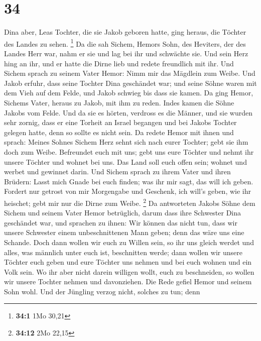 \hypertarget{section-8}{%
\section{34}\label{section-8}}

 Dina aber, Leas Tochter, die sie Jakob geboren hatte, ging
heraus, die Töchter des Landes zu sehen. \footnote{\textbf{34:1} 1Mo
  30,21}  Da die sah Sichem, Hemors Sohn, des Heviters, der
des Landes Herr war, nahm er sie und lag bei ihr und schwächte sie.
 Und sein Herz hing an ihr, und er hatte die Dirne lieb und
redete freundlich mit ihr.  Und Sichem sprach zu seinem
Vater Hemor: Nimm mir das Mägdlein zum Weibe.  Und Jakob
erfuhr, dass seine Tochter Dina geschändet war; und seine Söhne waren
mit dem Vieh auf dem Felde, und Jakob schwieg bis dass sie kamen.
 Da ging Hemor, Sichems Vater, heraus zu Jakob, mit ihm zu
reden.  Indes kamen die Söhne Jakobs vom Felde. Und da sie
es hörten, verdross es die Männer, und sie wurden sehr zornig, dass er
eine Torheit an Israel begangen und bei Jakobs Tochter gelegen hatte,
denn so sollte es nicht sein.  Da redete Hemor mit ihnen und
sprach: Meines Sohnes Sichem Herz sehnt sich nach eurer Tochter; gebt
sie ihm doch zum Weibe.  Befreundet euch mit uns; gebt uns
eure Töchter und nehmt ihr unsere Töchter  und wohnet bei
uns. Das Land soll euch offen sein; wohnet und werbet und gewinnet
darin.  Und Sichem sprach zu ihrem Vater und ihren Brüdern:
Lasst mich Gnade bei euch finden; was ihr mir sagt, das will ich geben.
 Fordert nur getrost von mir Morgengabe und Geschenk, ich
will's geben, wie ihr heischet; gebt mir nur die Dirne zum Weibe.
\footnote{\textbf{34:12} 2Mo 22,15}  Da antworteten Jakobs
Söhne dem Sichem und seinem Vater Hemor betrüglich, darum dass ihre
Schwester Dina geschändet war,  und sprachen zu ihnen: Wir
können das nicht tun, dass wir unsere Schwester einem unbeschnittenen
Mann geben; denn das wäre uns eine Schande.  Doch dann
wollen wir euch zu Willen sein, so ihr uns gleich werdet und alles, was
männlich unter euch ist, beschnitten werde;  dann wollen
wir unsere Töchter euch geben und eure Töchter uns nehmen und bei euch
wohnen und ein Volk sein.  Wo ihr aber nicht darein
willigen wollt, euch zu beschneiden, so wollen wir unsere Tochter nehmen
und davonziehen.  Die Rede gefiel Hemor und seinem Sohn
wohl.  Und der Jüngling verzog nicht, solches zu tun; denn
